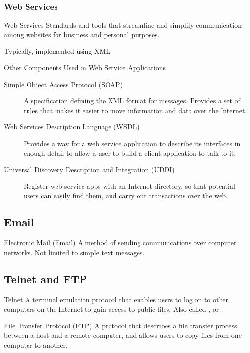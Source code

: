 \documentclass[\main/notes.tex]{subfiles}
\begin{document}
				\subsubsection{Web Services}
					\begin{definition}{Web Services}
						Standards and tools that streamline and simplify communication among websites for business and personal purposes.

						Typically, implemented using XML.
					\end{definition}
					\begin{sidenote}{Other Components Used in Web Service Applications}
						\begin{description}
							\item[Simple Object Access Protocol (SOAP)] A specification defining the XML format for messages. Provides a set of rules that makes it easier to move information and data over the Internet.
							\item[Web Services Description Language (WSDL)] Provides a way for a web service application to describe its interfaces in enough detail to allow a user to build a client application to talk to it.
							\item[Universal Discovery Description and Integration (UDDI)] Register web service apps with an Internet directory, so that potential users can easily find them, and carry out transactions over the web.
						\end{description}
					\end{sidenote}
			\subsection{Email}
				\begin{definition}{Electronic Mail (Email)}
					A method of sending communications over computer networks. Not limited to simple text messages.
				\end{definition}
			\subsection{Telnet and FTP}
				\begin{definition}{Telnet}
					A terminal emulation protocol that enables users to log on to other computers on the Internet to gain access to public files. Also called , or .
				\end{definition}
				\begin{definition}{File Transfer Protocol (FTP)}
					A protocol that describes a file transfer process between a host and a remote computer, and allows users to copy files from one computer to another.
				\end{definition}
\end{document}
